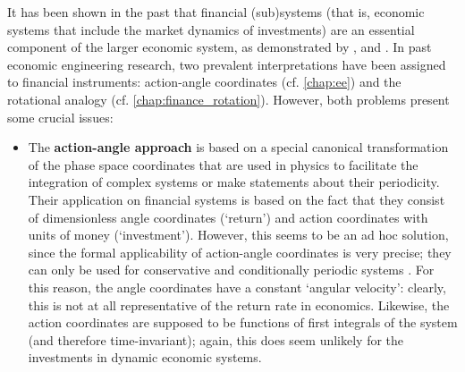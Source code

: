 It has been shown in the past that financial (sub)systems (that is, economic systems that include the market dynamics of investments) are an essential component of the larger economic system, as demonstrated by \citet{Kruimer2021}, \citet{Vos2019} and \citet{VanArdenne2020}. In past economic engineering research, two prevalent interpretations have been assigned to financial instruments: action-angle coordinates (cf. \cref{chap:ee}) and the rotational analogy (cf. \cref{chap:finance_rotation}). However, both problems present some crucial issues:
\begin{itemize}
    \item The \textbf{action-angle approach} is based on a special canonical transformation of the phase space coordinates that are used in physics to facilitate the integration of complex systems or make statements about their periodicity. Their application on financial systems is based on the fact that they consist of dimensionless angle coordinates (`return') and action coordinates with units of money (`investment'). However, this seems to be an ad hoc solution, since the formal applicability of action-angle coordinates is very precise; they can only be used for conservative and conditionally periodic systems \cite{Arnold1989}. For this reason, the angle coordinates have a constant `angular velocity': clearly, this is not at all representative of the return rate in economics. Likewise, the action coordinates are supposed to be functions of first integrals of the system (and therefore time-invariant); again, this does seem unlikely for the investments in dynamic economic systems. 
    

\end{itemize}
